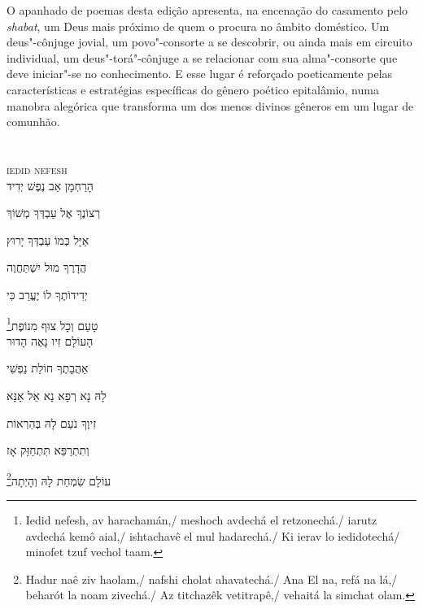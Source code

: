 O apanhado de poemas desta edição apresenta, na encenação do
casamento pelo \emph{shabat}, um Deus mais próximo de quem o procura no âmbito
doméstico. Um deus"-cônjuge jovial, um povo"-consorte a se descobrir, ou
ainda mais em circuito individual, um deus"-torá"-cônjuge a se relacionar
com sua alma"-consorte que deve iniciar"-se no conhecimento. E esse lugar
é reforçado poeticamente pelas características e estratégias específicas
do gênero poético epitalâmio, numa manobra alegórica que transforma um
dos menos divinos gêneros em um lugar de comunhão.



\chapter*{}
\begin{center}
\begin{vplace}[0.3]
\Large
{}
\end{vplace}
\end{center}
\thispagestyle{empty}

\begingroup
\movetoevenpage
\raggedleft

\vspace*{1cm}

\textsc{iedid nefesh}\\[15pt]

הָרַחְמָן אַב נֶפֶשׁ יְדִיד

רְצוֹנֶךָ אֶל עַבְדְּךָ מְשׁוֹךְ

אַיָּל כְּמוֹ עַבְדְּךָ יָרוּץ

הֲדָרֶךָ מוּל יִשְׁתַּחֲוֶה

יְדִידוֹתֶךָ לוֹ יֶעֱרַב  כִּי

\footnote{Iedid nefesh, av harachamán,/ meshoch avdechá el retzonechá./ iarutz avdechá kemô aial,/ ishtachavê el mul hadarechá./ Ki ierav lo iedidotechá/ minofet tzuf vechol taam.}טָעַם וְכָל צוּף מִנוֹפֶת\\[10pt]

הָעוֹלָם זִיו נָאֶה הָדוּר

אַהֲבָתֶךָ חוֹלַת נַפְשִׁי

לָהּ נָא רְפָא נָא אֵל אָנָּא

זִיוֶךָ נֹעַם לָהּ בְּהַרְאוֹת

וְתִתְרַפֵּא תִּתְחַזֵּק אָז

\footnote{Hadur naê ziv haolam,/ nafshi cholat ahavatechá./ Ana El na, refá na lá,/ beharót la noam zivechá./ Az titchazêk vetitrapê,/ vehaitá la simchat olam.}עוֹלָם שִׂמְחַת לָהּ וְהָיְתָה\\[10pt]

